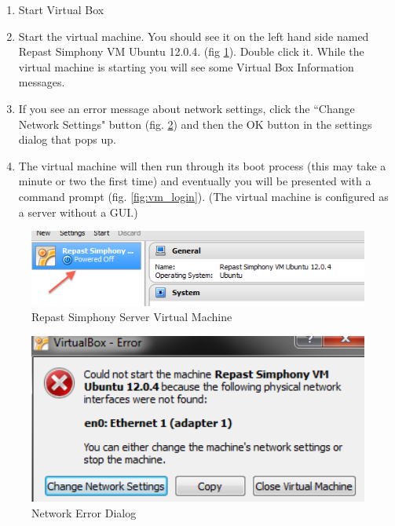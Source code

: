 \documentclass[11pt]{amsart}
\begin{document}
\begin{enumerate}
\item Start Virtual Box
\item Start the virtual machine. You should see it on the left hand side named Repast Simphony VM Ubuntu 12.0.4. (fig \ref{fig:vm}). Double click it. While the virtual machine is starting you will see some Virtual Box Information messages.
\item If you see an error message about network settings, click the ``Change Network Settings" button (fig. \ref{fig:network_error}) and then the OK button in the settings dialog that pops up.
\item The virtual machine will then run through its boot process (this may take a minute or two the first time) and eventually you will be presented with a command prompt (fig. \ref{fig:vm_login}). (The virtual machine is configured as a server without a GUI.)
\end{enumerate}

\begin{figure}[h]
\begin{center}
\vspace{.2in}
\centerline {
\includegraphics[width=4.5in]{images/vm.png}
}
\caption{Repast Simphony Server Virtual Machine}
\label{fig:vm}
\end{center}
\end{figure}

\begin{figure}[h]
\begin{center}
\vspace{.2in}
\centerline {
\includegraphics[width=4.5in]{images/network_error.png}
}
\caption{Network Error Dialog}
\label{fig:network_error}
\end{center}
\end{figure}
\end{document}
